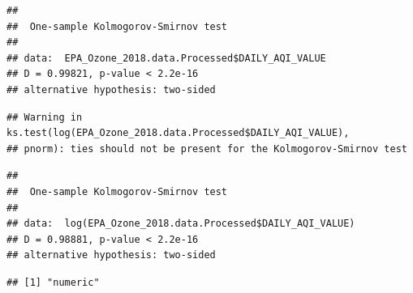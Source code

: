 \documentclass[12pt,]{article}
\newenvironment{Shaded}{\begin{snugshade}}{\end{snugshade}}
\newcommand{\KeywordTok}[1]{\textcolor[rgb]{0.13,0.29,0.53}{\textbf{#1}}}
\newcommand{\FloatTok}[1]{\textcolor[rgb]{0.00,0.00,0.81}{#1}}
\newcommand{\StringTok}[1]{\textcolor[rgb]{0.31,0.60,0.02}{#1}}
\newcommand{\CommentTok}[1]{\textcolor[rgb]{0.56,0.35,0.01}{\textit{#1}}}
\newcommand{\OperatorTok}[1]{\textcolor[rgb]{0.81,0.36,0.00}{\textbf{#1}}}
\newcommand{\NormalTok}[1]{#1}
\begin{document}
\begin{verbatim}
## 
##  One-sample Kolmogorov-Smirnov test
## 
## data:  EPA_Ozone_2018.data.Processed$DAILY_AQI_VALUE
## D = 0.99821, p-value < 2.2e-16
## alternative hypothesis: two-sided
\end{verbatim}

\begin{Shaded}
\end{Shaded}

\begin{verbatim}
## Warning in ks.test(log(EPA_Ozone_2018.data.Processed$DAILY_AQI_VALUE),
## pnorm): ties should not be present for the Kolmogorov-Smirnov test
\end{verbatim}

\begin{verbatim}
## 
##  One-sample Kolmogorov-Smirnov test
## 
## data:  log(EPA_Ozone_2018.data.Processed$DAILY_AQI_VALUE)
## D = 0.98881, p-value < 2.2e-16
## alternative hypothesis: two-sided
\end{verbatim}

\begin{Shaded}
\end{Shaded}

\begin{verbatim}
## [1] "numeric"
\end{verbatim}

\begin{Shaded}
\end{Shaded}
\end{document}
